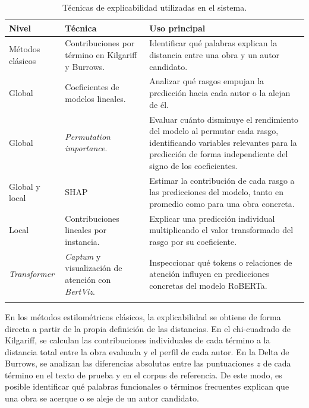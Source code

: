 \documentclass[IB]{TFUOC}%
\begin{document}
\begin{longtable}{|p{3.8cm}|p{5cm}|p{5.9cm}|}
\hline
\textbf{Nivel} & \textbf{Técnica} & \textbf{Uso principal} \\
\hline

Métodos clásicos &
Contribuciones por término en Kilgariff y Burrows. &
Identificar qué palabras explican la distancia entre una obra y un autor candidato. \\
\hline

Global &
Coeficientes de modelos lineales. &
Analizar qué rasgos empujan la predicción hacia cada autor o la alejan de él. \\
\hline

Global &
\textit{Permutation importance}. &
Evaluar cuánto disminuye el rendimiento del modelo al permutar cada rasgo, identificando variables relevantes para la predicción de forma independiente del signo de los coeficientes. \\
\hline

Global y local &
SHAP &
Estimar la contribución de cada rasgo a las predicciones del modelo, tanto en promedio como para una obra concreta. \\
\hline

Local &
Contribuciones lineales por instancia. &
Explicar una predicción individual multiplicando el valor transformado del rasgo por su coeficiente. \\
\hline

\textit{Transformer} &
\textit{Captum} y visualización de atención con \textit{BertViz}. &
Inspeccionar qué tokens o relaciones de atención influyen en predicciones concretas del modelo RoBERTa. \\
\hline

\caption{Técnicas de explicabilidad utilizadas en el sistema.}
\label{tab:explicabilidad}
\end{longtable}

En los métodos estilométricos clásicos, la explicabilidad se obtiene de forma directa a partir de la propia definición de las distancias. En el chi-cuadrado de Kilgariff, se calculan las contribuciones individuales de cada término a la distancia total entre la obra evaluada y el perfil de cada autor. En la Delta de Burrows, se analizan las diferencias absolutas entre las puntuaciones $z$ de cada término en el texto de prueba y en el corpus de referencia. De este modo, es posible identificar qué palabras funcionales o términos frecuentes explican que una obra se acerque o se aleje de un autor candidato.
\end{document}
